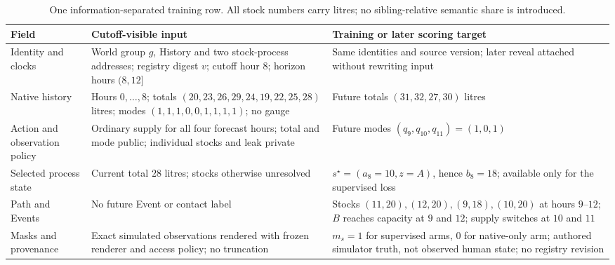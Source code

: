 \documentclass[10pt]{article}
\begin{document}
\begin{table}[H]
\centering
\small
\begin{tabularx}{\textwidth}{@{}p{}YY@{}}
\toprule
Field & Cutoff-visible input & Training or later scoring target \\
\midrule
Identity and clocks & World group $g$, History and two stock-process addresses;
registry digest $v$; cutoff hour $8$; horizon hours $(8,12]$ &
Same identities and source version; later reveal attached without rewriting input \\
Native history & Hours $0,\ldots,8$; totals
$(20,23,26,29,24,19,22,25,28)$ litres; modes
$(1,1,1,0,0,1,1,1,1)$; no gauge &
Future totals $(31,32,27,30)$ litres \\
Action and observation policy & Ordinary supply for all four forecast hours;
total and mode public; individual stocks and leak private &
Future modes $(q_9,q_{10},q_{11})=(1,0,1)$ \\
Selected process state & Current total $28$ litres; stocks otherwise unresolved &
$s^\star=(a_8=10,z=A)$, hence $b_8=18$; available only for the supervised loss \\
Path and Events & No future Event or contact label &
Stocks $(11,20),(12,20),(9,18),(10,20)$ at hours $9$--$12$;
$B$ reaches capacity at $9$ and $12$;
supply switches at $10$ and $11$ \\
Masks and provenance & Exact simulated observations rendered with frozen
renderer and access policy; no truncation &
$m_s=1$ for supervised arms, $0$ for native-only arm;
authored simulator truth, not observed human state; no registry revision \\
\bottomrule
\end{tabularx}
\caption{One information-separated training row. All stock numbers carry
litres; no sibling-relative semantic share is introduced.}
\label{tab:reservoir-row}
\end{table}
\end{document}
